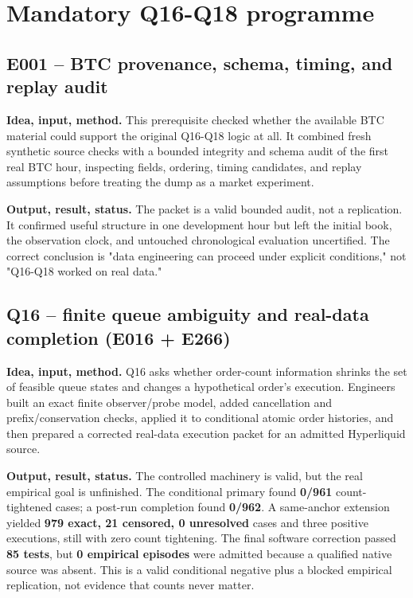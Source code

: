\documentclass[10pt,a4paper]{article}
\begin{document}
\section{Mandatory Q16-Q18 programme}
\subsection{E001 -- BTC provenance, schema, timing, and replay audit}
\textbf{Idea, input, method.} This prerequisite checked whether the available BTC material could support the original Q16-Q18 logic at all. It combined fresh synthetic source checks with a bounded integrity and schema audit of the first real BTC hour, inspecting fields, ordering, timing candidates, and replay assumptions before treating the dump as a market experiment.\par
\textbf{Output, result, status.} The packet is a valid bounded audit, not a replication. It confirmed useful structure in one development hour but left the initial book, the observation clock, and untouched chronological evaluation uncertified. The correct conclusion is "data engineering can proceed under explicit conditions," not "Q16-Q18 worked on real data."\par
\subsection{Q16 -- finite queue ambiguity and real-data completion (E016 + E266)}
\textbf{Idea, input, method.} Q16 asks whether order-count information shrinks the set of feasible queue states and changes a hypothetical order's execution. Engineers built an exact finite observer/probe model, added cancellation and prefix/conservation checks, applied it to conditional atomic order histories, and then prepared a corrected real-data execution packet for an admitted Hyperliquid source.\par
\textbf{Output, result, status.} The controlled machinery is valid, but the real empirical goal is unfinished. The conditional primary found \textbf{0/961} count-tightened cases; a post-run completion found \textbf{0/962}. A same-anchor extension yielded \textbf{979 exact, 21 censored, 0 unresolved} cases and three positive executions, still with zero count tightening. The final software correction passed \textbf{85 tests}, but \textbf{0 empirical episodes} were admitted because a qualified native source was absent. This is a valid conditional negative plus a blocked empirical replication, not evidence that counts never matter.\par
\end{document}
